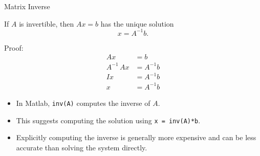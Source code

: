 \documentclass[10pt]{beamer}
\begin{document}
\begin{frame}{Matrix Inverse}

\begin{block}{}
If $A$ is invertible, then $Ax=b$ has the unique solution
\[
    x=A^{-1}b.
\]
\end{block}

Proof: 
\begin{align*}
              Ax &= b     \\
    A^{-1}\, A x &= A^{-1}b  \\
              Ix &= A^{-1}b   \\
               x &= A^{-1}b
\end{align*}

\begin{itemize}
    \item<2-> In Matlab, \texttt{inv(A)} computes the inverse of $A$.
    \item<2-> This suggests computing the solution using
    \texttt{x = inv(A)*b}.
    \item<3-> Explicitly computing the inverse is generally
    more expensive and can be less accurate than solving
    the system directly.
\end{itemize}

\end{frame}
\end{document}
